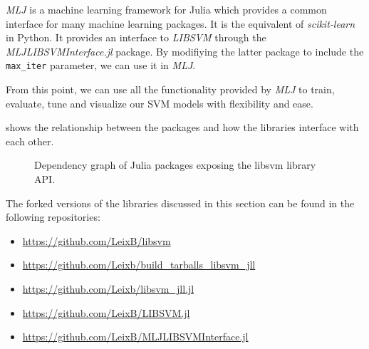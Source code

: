 \emph{MLJ} \cite{blaomMLJJuliaPackage2020} is a machine learning framework for Julia which provides a common interface
for many machine learning packages. It is the equivalent of \emph{scikit-learn} in Python. It provides
an interface to \emph{LIBSVM} through the \emph{MLJLIBSVMInterface.jl} package. By modifiying the latter
package to include the \texttt{max\_iter} parameter, we can use it in \emph{MLJ}.

From this point, we can use all the functionality provided by \emph{MLJ} to train, evaluate,
tune and visualize our SVM models with flexibility and ease.

 shows the relationship between the packages and how the
libraries interface with each other.

\begin{figure}[H]
\caption{Dependency graph of Julia packages exposing the libsvm library API.}
\label{fig:julia_libsvm_deps}
\end{figure}

The forked versions of the libraries discussed in this section can be found in the following
repositories:
\begin{itemize}
    \item \url{https://github.com/LeixB/libsvm}
    \item \url{https://github.com/Leixb/build\_tarballs\_libsvm\_jll}
    \item \url{https://github.com/Leixb/libsvm\_jll.jl}
    \item \url{https://github.com/LeixB/LIBSVM.jl}
    \item \url{https://github.com/LeixB/MLJLIBSVMInterface.jl}
\end{itemize}


